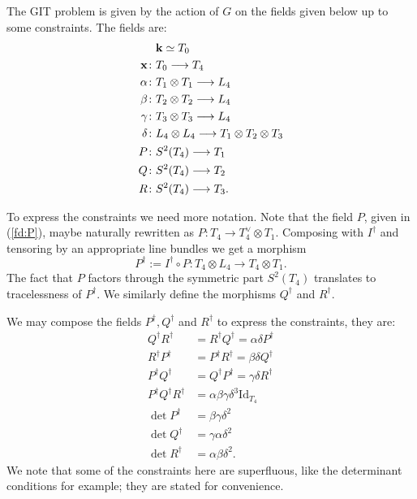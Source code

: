\documentclass{amsart}
\theoremstyle{definition}
\begin{document}
The GIT problem is given by the action of $G$ on the fields given below up to some constraints.
The fields are:
\begin{align}
&\mathbf{k} \simeq T_0 \\
\mathbf{x} \colon &T_0 \longrightarrow T_4 \label{fd:x} \\
\alpha \colon &T_1 \otimes T_1 \longrightarrow L_4 \label{fd:alpha} \\
\beta \colon &T_2 \otimes T_2 \longrightarrow L_4 \label{fd:beta} \\
\gamma \colon &T_3 \otimes T_3 \longrightarrow L_4 \label{fd:gamma} \\
\delta \colon &L_4 \otimes L_4 \longrightarrow T_1 \otimes T_2 \otimes T_3 \label{fd:delta} \\
P \colon &S^2(T_4) \longrightarrow T_1 \label{fd:P} \\ 
Q \colon &S^2(T_4) \longrightarrow T_2 \label{fd:Q} \\
R \colon &S^2(T_4) \longrightarrow T_3. \label{fd:R}
\end{align}

To express the constraints we need more notation.
Note that the field $P$, given in (\ref{fd:P}), maybe naturally rewritten as $P \colon T_4 \rightarrow T_4^\vee \otimes T_1$.
Composing with $I^\dagger$ and tensoring by an appropriate line bundles we get a morphism $$P^\dagger:= I^\dagger \circ P \colon T_4 \otimes L_4 \rightarrow T_4 \otimes T_1.$$
The fact that $P$ factors through the symmetric part $S^2(T_4)$ translates to tracelessness of $P^\dagger$.
We similarly define the morphisms $Q^\dagger$ and $R^\dagger$.

We may compose the fields $P^\dagger,Q^\dagger$ and $R^\dagger$ to express the constraints, they
are:
\begin{align}
    Q^\dagger R^\dagger &= R^\dagger Q^\dagger = \alpha \delta P^\dagger \label{con:qr} \\
    R^\dagger P^\dagger &= P^\dagger R^\dagger = \beta \delta Q^\dagger \label{con:rp} \\
    P^\dagger Q^\dagger &= Q^\dagger P^\dagger = \gamma \delta R^\dagger \label{con:pq} \\
    P^\dagger Q^\dagger R^\dagger &= \alpha \beta \gamma \delta^3 \text{Id}_{T_4} \label{con:pqr} \\
    \det P^\dagger &= \beta \gamma \delta^2 \\
    \det Q^\dagger &= \gamma \alpha \delta^2 \\
    \det R^\dagger &= \alpha \beta \delta^2.
\end{align}
We note that some of the constraints here are superfluous, like the determinant conditions for example; they are stated for convenience.
\end{document}
